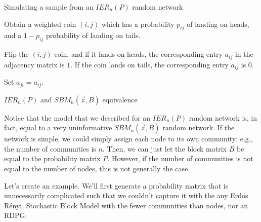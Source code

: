 \begin{algorithm}[h]\caption{Simulating a sample from an $IER_n(P)$ random network}
\label{alg:ch5:ier}
\SetAlgoLined
{}

 {
     {
        Obtain a weighted coin $(i,j)$ which has a probability $p_{ij}$ of landing on heads, and a $1 - p_{ij}$ probability of landing on tails.

        Flip the $(i,j)$ coin, and if it lands on heads, the corresponding entry $a_{ij}$ in the adjacency matrix is $1$. If the coin lands on tails, the corresponding entry $a_{ij}$ is $0$. 

        Set $a_{ji} = a_{ij}$.
    }
}
\end{algorithm}

\begin{floatingbox}[h]\caption{$IER_n(P)$ and $SBM_n(\vec z, B)$ equivalence}
Notice that the model that we described for an $IER_n(P)$ random network is, in fact, equal to a very uninformative $SBM_n(\vec z, B)$ random network. If the network is simple, we could simply assign each node to its own community; e.g., the number of communities is $n$. Then, we can just let the block matrix $B$ be equal to the probability matrix $P$. However, if the number of communities is not equal to the number of nodes, this is not generally the case.
\end{floatingbox}

Let's create an example. We'll first generate a probability matrix that is unnecessarily complicated such that we couldn't capture it with the any Erd\"os R\'enyi, Stochastic Block Model with the fewer communities than nodes, nor an RDPG:

